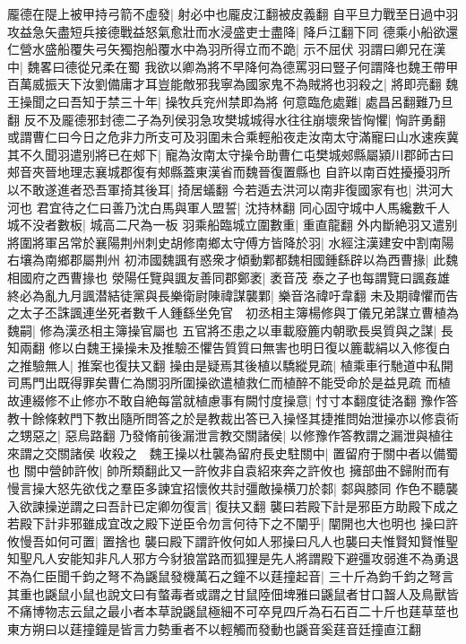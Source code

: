 龎德在隄上被甲持弓箭不虛發|{
	射必中也龎皮江翻被皮義翻}
自平旦力戰至日過中羽攻益急矢盡短兵接德戰益怒氣愈壯而水浸盛吏士盡降|{
	降戶江翻下同}
德乘小船欲還仁營水盛船覆失弓矢獨抱船覆水中為羽所得立而不跪|{
	示不屈伏}
羽謂曰卿兄在漢中|{
	魏畧曰德從兄柔在蜀}
我欲以卿為將不早降何為德罵羽曰豎子何謂降也魏王帶甲百萬威振天下汝劉備庸才耳豈能敵邪我寧為國家鬼不為賊將也羽殺之|{
	將即亮翻}
魏王操聞之曰吾知于禁三十年|{
	操牧兵兖州禁即為將}
何意臨危處難|{
	處昌呂翻難乃旦翻}
反不及龎德邪封德二子為列侯羽急攻樊城城得水往往崩壞衆皆恟懼|{
	恟許勇翻}
或謂曹仁曰今日之危非力所支可及羽圍未合乘輕船夜走汝南太守滿寵曰山水速疾冀其不久聞羽遣别將已在郟下|{
	寵為汝南太守操令助曹仁屯樊城郟縣屬潁川郡師古曰郟音夾晉地理志襄城郡復有郟縣蓋東漢省而魏晉復置縣也}
自許以南百姓擾擾羽所以不敢遂進者恐吾軍掎其後耳|{
	掎居蟻翻}
今若遁去洪河以南非復國家有也|{
	洪河大河也}
君宜待之仁曰善乃沈白馬與軍人盟誓|{
	沈持林翻}
同心固守城中人馬纔數千人城不没者數板|{
	城高二尺為一板}
羽乘船臨城立圍數重|{
	重直龍翻}
外内斷絶羽又遣别將圍將軍呂常於襄陽荆州刺史胡修南鄉太守傅方皆降於羽|{
	水經注漢建安中割南陽右壤為南鄉郡屬荆州}
初沛國魏諷有惑衆才傾動鄴都魏相國鍾繇辟以為西曹掾|{
	此魏相國府之西曹掾也}
滎陽任覽與諷友善同郡鄭袤|{
	袤音茂}
泰之子也每謂覽曰諷姦雄終必為亂九月諷潜結徒黨與長樂衛尉陳禕謀襲鄴|{
	樂音洛禕吁韋翻}
未及期禕懼而告之太子丕誅諷連坐死者數千人鍾繇坐免官　初丞相主簿楊修與丁儀兄弟謀立曹植為魏嗣|{
	修為漢丞相主簿操官屬也}
五官將丕患之以車載廢簏内朝歌長吳質與之謀|{
	長知兩翻}
修以白魏王操操未及推驗丕懼告質質曰無害也明日復以簏載絹以入修復白之推驗無人|{
	推案也復扶又翻}
操由是疑焉其後植以驕縱見疏|{
	植乘車行馳道中私開司馬門出既得罪矣曹仁為關羽所圍操欲遣植救仁而植醉不能受命於是益見疏}
而植故連綴修不止修亦不敢自絶每當就植慮事有闕忖度操意|{
	忖寸本翻度徒洛翻}
豫作答教十餘條敕門下教出隨所問答之於是教裁出答已入操怪其捷推問始泄操亦以修袁術之甥惡之|{
	惡烏路翻}
乃發脩前後漏泄言教交關諸侯|{
	以修豫作答教謂之漏泄與植往來謂之交關諸侯}
收殺之　魏王操以杜襲為留府長史駐關中|{
	置留府于關中者以備蜀也}
關中營帥許攸|{
	帥所類翻此又一許攸非自袁紹來奔之許攸也}
擁部曲不歸附而有慢言操大怒先欲伐之羣臣多諫宜招懷攸共討彊敵操横刀於䣛|{
	䣛與膝同}
作色不聽襲入欲諫操逆謂之曰吾計已定卿勿復言|{
	復扶又翻}
襲曰若殿下計是邪臣方助殿下成之若殿下計非邪雖成宜改之殿下逆臣令勿言何待下之不闡乎|{
	闡開也大也明也}
操曰許攸慢吾如何可置|{
	置捨也}
襲曰殿下謂許攸何如人邪操曰凡人也襲曰夫惟賢知賢惟聖知聖凡人安能知非凡人邪方今豺狼當路而狐狸是先人將謂殿下避彊攻弱進不為勇退不為仁臣聞千鈞之弩不為鼷鼠發機萬石之鐘不以莛撞起音|{
	三十斤為鈞千鈞之弩言其重也鼷鼠小鼠也說文曰有螫毒者或謂之甘鼠陸佃埤雅曰鼷鼠者甘口齧人及鳥獸皆不痛博物志云鼠之最小者本草說鼷鼠極細不可卒見四斤為石石百二十斤也莛草莖也東方朔曰以莛撞鐘是皆言力勢重者不以輕觸而發動也鼷音奚莛音廷撞直江翻}
